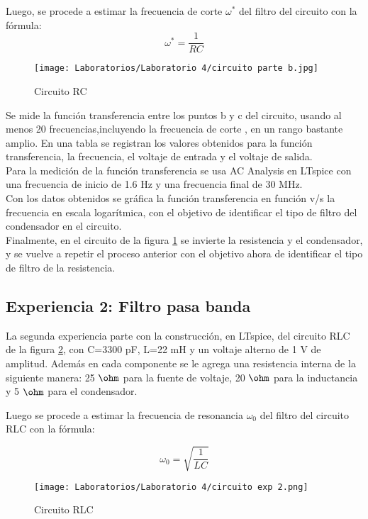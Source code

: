 \documentclass[letterpaper,11pt]{article} %
\begin{document}
Luego, se procede a estimar la frecuencia de corte $\omega^*$ del filtro del circuito con la fórmula:
$$\omega^*=\frac{1}{RC}$$
\begin{figure}
    \centering
    \texttt{[image: Laboratorios/Laboratorio 4/circuito parte b.jpg]}
    \caption{Circuito RC}
    \label{circuito RC}
\end{figure}
Se mide la función transferencia entre los puntos b y c del circuito, usando al menos 20 frecuencias,incluyendo la frecuencia de corte , en un rango bastante amplio. En una tabla se registran los valores obtenidos para la función transferencia, la frecuencia, el voltaje de entrada y el voltaje de salida. \\

Para la medición de la función transferencia se usa AC Analysis en LTspice con una frecuencia de inicio de 1.6 Hz y una frecuencia final de 30 MHz.  \\

Con los datos obtenidos se gráfica la función transferencia en función v/s la frecuencia en escala logarítmica, con el objetivo de identificar el tipo de filtro del condensador en el circuito.\\

Finalmente, en el circuito de la figura \ref{circuito RC}
se invierte la resistencia y el condensador, y se vuelve a repetir el proceso anterior con el objetivo ahora de identificar el tipo de filtro de la resistencia.




\subsection{Experiencia 2: Filtro pasa banda}
La segunda experiencia parte con la construcción, en LTspice, del circuito RLC de la figura \ref{circuito RLC}, con C=3300 pF, L=22 mH y un voltaje alterno de 1 V de amplitud.  Además en cada componente se le agrega una resistencia interna de la siguiente manera: 25 $\ohm$ para la fuente de voltaje, 20 $\ohm$ para la inductancia y 5 $\ohm$ para el condensador. 

Luego se procede a estimar la frecuencia de resonancia $\omega_0$ del filtro del circuito RLC con la fórmula:

$$\omega_0=\sqrt{\frac{1}{LC}}$$


\begin{figure}
    \centering
    \texttt{[image: Laboratorios/Laboratorio 4/circuito exp 2.png]}
    \caption{Circuito RLC}
    \label{circuito RLC}
\end{figure}
\end{document}
